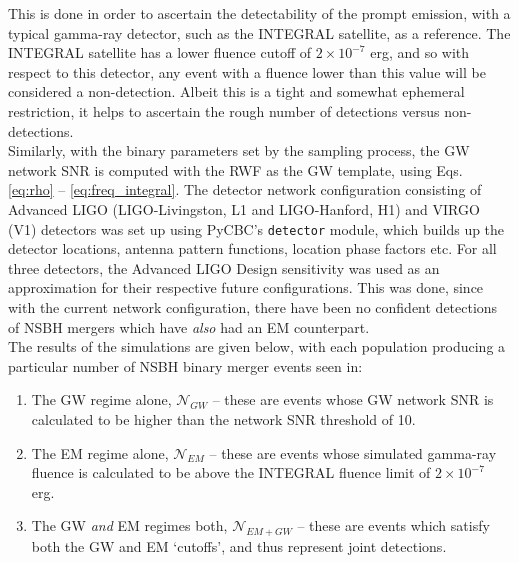     This is done in order to ascertain the detectability of the prompt emission, with a
    typical gamma-ray detector, such as the INTEGRAL satellite, as a reference. The
    INTEGRAL satellite has a lower fluence cutoff of $2 \times 10^{-7}$ erg, and so with
    respect to this detector, any event with a fluence lower than this value will be
    considered a non-detection. Albeit this is a tight and somewhat ephemeral
    restriction, it helps to ascertain the rough number of detections versus
    non-detections.\\
    Similarly, with the binary parameters set by the sampling process, the GW network
    SNR is computed with the RWF as the GW template, using Eqs. \ref{eq:rho} --
    \ref{eq:freq_integral}. The detector network configuration consisting of Advanced
    LIGO (LIGO-Livingston, L1 and LIGO-Hanford, H1) and VIRGO (V1) detectors was set up
    using PyCBC's \texttt{detector} module, which builds up the detector locations,
    antenna pattern functions, location phase factors etc. For all three detectors, the
    Advanced LIGO Design sensitivity was used as an approximation for their respective
    future configurations. This was done, since with the current network configuration,
    there have been no confident detections of NSBH mergers which have \textit{also} had
    an EM counterpart.\\
    The results of the simulations are given below, with each population producing a
    particular number of NSBH binary merger events seen in:

    \begin{enumerate}

        \item The GW regime alone, $\boxed{\mathcal{N}_{GW}}$ -- these are events whose
            GW network SNR is calculated to be higher than the network SNR threshold of
            10.

        \item The EM regime alone, $\boxed{\mathcal{N}_{EM}}$ -- these are events whose
            simulated gamma-ray fluence is calculated to be above the INTEGRAL fluence
            limit of $2 \times 10^{-7}$ erg.

        \item The GW \textit{and} EM regimes both, $\boxed{\mathcal{N}_{EM+GW}}$ --
            these are events which satisfy both the GW and EM `cutoffs', and thus
            represent joint detections.

    \end{enumerate}

